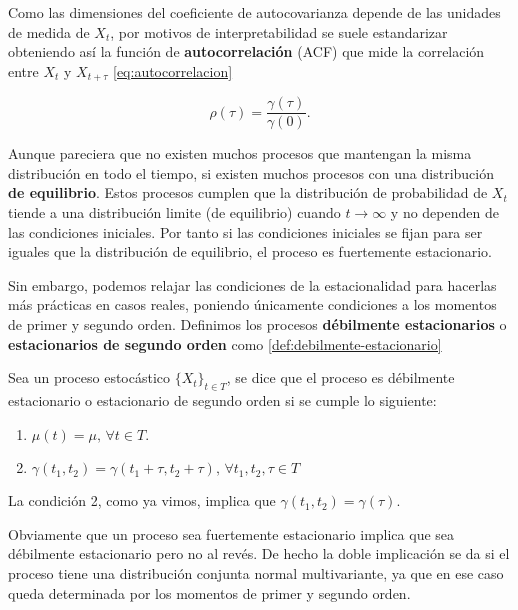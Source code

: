 Como las dimensiones del coeficiente de autocovarianza depende de las unidades de medida de $X_t$, por motivos de interpretabilidad se suele estandarizar obteniendo así la función de \textbf{autocorrelación} (ACF) que mide la correlación entre $X_t$ y $X_{t + \tau}$ \eqref{eq:autocorrelacion}

\begin{equation}
  \rho(\tau) = \dfrac{\gamma(\tau)}{\gamma(0)}.
  \label{eq:autocorrelacion}
\end{equation}

Aunque pareciera que no existen muchos procesos que mantengan la misma distribución en todo el tiempo, si existen muchos procesos con una distribución \textbf{de equilibrio}. Estos procesos cumplen que la distribución de probabilidad de $X_t$ tiende a una distribución limite (de equilibrio) cuando $t \to \infty$ y no dependen de las condiciones iniciales. Por tanto si las condiciones iniciales se fijan para ser iguales que la distribución de equilibrio, el proceso es fuertemente estacionario.

Sin embargo, podemos relajar las condiciones de la estacionalidad para hacerlas más prácticas en casos reales, poniendo únicamente condiciones a los momentos de primer y segundo orden. Definimos los procesos \textbf{débilmente estacionarios} o \textbf{estacionarios de segundo orden} como \autoref{def:debilmente-estacionario}

\begin{definicion}
  Sea un proceso estocástico $\{X_t\}_{t \in T}$, se dice que el proceso es débilmente estacionario o estacionario de segundo orden si se cumple lo siguiente:

  \begin{enumerate}
    \item $\mu(t) = \mu, \, \forall t \in T$.
    \item $\gamma(t_1, t_2) = \gamma  (t_1 + \tau, t_2 + \tau), \, \forall t_1, t_2, \tau \in T$
  \end{enumerate}

  La condición 2, como ya vimos, implica que $\gamma(t_1, t_2) = \gamma(\tau)$.
  \label{def:debilmente-estacionario}
\end{definicion}

Obviamente que un proceso sea fuertemente estacionario implica que sea débilmente estacionario pero no al revés. De hecho la doble implicación se da si el proceso tiene una distribución conjunta normal multivariante, ya que en ese caso queda determinada por los momentos de primer y segundo orden.

